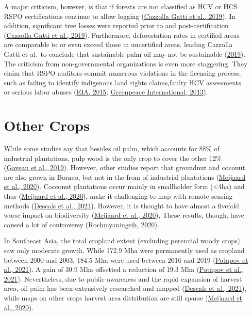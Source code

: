 \documentclass[
  letterpaper,
  DIV=11,
  numbers=noendperiod]{scrreprt}
\begin{document}
A major criticism, however, is that if forests are not classified as HCV
or HCS RSPO certifications continue to allow logging
(\protect\hyperlink{ref-cazzollagattiSustainablePalmOil2019}{Cazzolla
Gatti et al., 2019}). In addition, significant tree losses were reported
prior to and post-certification
(\protect\hyperlink{ref-cazzollagattiSustainablePalmOil2019}{Cazzolla
Gatti et al., 2019}). Furthermore, deforestation rates in certified
areas are comparable to or even exceed those in uncertified areas,
leading Cazzolla Gatti et al.~to conclude that sustainable palm oil may
not be sustainable
(\protect\hyperlink{ref-cazzollagattiSustainablePalmOil2019}{2019}). The
criticism from non-governmental organizations is even more staggering.
They claim that RSPO auditors commit numerous violations in the
licensing process, such as failing to identify indigenous land rights
claims,faulty HCV assessments or serious labor abuses
(\protect\hyperlink{ref-eiaWhoWatchesWatchmen2015}{EIA, 2015};
\protect\hyperlink{ref-greenpeaceinternationalCertifyingDestruction2013}{Greenpeace
International, 2013}).

\hypertarget{other-crops}{%
\section{Other Crops}\label{other-crops}}

While some studies say that besides oil palm, which accounts for 88\% of
industrial plantations, pulp wood is the only crop to cover the other
12\% (\protect\hyperlink{ref-gaveauRiseFallForest2019}{Gaveau et al.,
2019}). However, other studies report that groundnut and coconut are
also grown in Borneo, but not in the from of industrial plantations
(\protect\hyperlink{ref-meijaardCoconutOilConservation2020}{Meijaard et
al., 2020}). Cocconut plantations occur mainly in smallholder form
(\textless4ha) and thus
(\protect\hyperlink{ref-meijaardCoconutOilConservation2020}{Meijaard et
al., 2020}), make it challenging to map with remote sensing methods
(\protect\hyperlink{ref-descalsHighresolutionGlobalMap2021}{Descals et
al., 2021}). However, it is thought to have almost a fivefold worse
impact on biodiversity
(\protect\hyperlink{ref-meijaardCoconutOilConservation2020}{Meijaard et
al., 2020}), These results, though, have caused a lot of controversy
(\protect\hyperlink{ref-rochmyaningsihClaimThatCoconut2020}{Rochmyaningsih,
2020}).

In Southeast Asia, the total cropland extent (excluding perennial woody
crops) saw only moderate growth. While 172.9 Mha were permanently used
as cropland between 2000 and 2003, 184.5 Mha were used between 2016 and
2019 (\protect\hyperlink{ref-potapovGlobalMapsCropland2021}{Potapov et
al., 2021}). A gain of 30.9 Mha offsetted a reduction of 19.3 Mha
(\protect\hyperlink{ref-potapovGlobalMapsCropland2021}{Potapov et al.,
2021}). Nevertheless, due to public awareness and the rapid expansion of
harvest area, oil palm has been extensively researched and mapped
(\protect\hyperlink{ref-descalsHighresolutionGlobalMap2021}{Descals et
al., 2021}), while maps on other crops harvest area distribution are
still sparse
(\protect\hyperlink{ref-meijaardCoconutOilConservation2020}{Meijaard et
al., 2020}).
\end{document}
